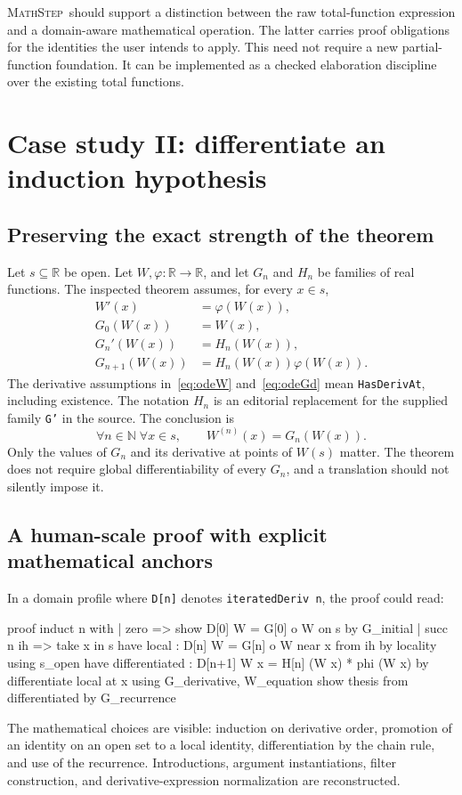 \documentclass[11pt,a4paper]{article}
\theoremstyle{remark}
\newcommand{\ms}{\textsc{MathStep}}
\newcommand{\ty}[1]{\texttt{#1}}
\newcommand{\R}{\mathbb{R}}
\newcommand{\N}{\mathbb{N}}
\begin{document}
\ms\ should support a distinction between the raw total-function expression and a domain-aware mathematical operation. The latter carries proof obligations for the identities the user intends to apply. This need not require a new partial-function foundation. It can be implemented as a checked elaboration discipline over the existing total functions.

\section{Case study II: differentiate an induction hypothesis}\label{sec:ode}

\subsection{Preserving the exact strength of the theorem}
Let $s\subseteq\R$ be open. Let $W,\varphi:\R\to\R$, and let $G_n$ and $H_n$ be families of real functions. The inspected theorem assumes, for every $x\in s$,
\begin{align}
 W'(x)&=\varphi(W(x)),\label{eq:odeW}\\
 G_0(W(x))&=W(x),\label{eq:odeG0}\\
 G_n'(W(x))&=H_n(W(x)),\label{eq:odeGd}\\
 G_{n+1}(W(x))&=H_n(W(x))\varphi(W(x)).\label{eq:odeGs}
\end{align}
The derivative assumptions in~\eqref{eq:odeW} and~\eqref{eq:odeGd} mean \ty{HasDerivAt}, including existence. The notation $H_n$ is an editorial replacement for the supplied family \ty{G'} in the source. The conclusion is
\begin{equation}\label{eq:odeconclusion}
\forall n\in\N\;\forall x\in s,\qquad W^{(n)}(x)=G_n(W(x)).
\end{equation}
Only the values of $G_n$ and its derivative at points of $W(s)$ matter. The theorem does not require global differentiability of every $G_n$, and a translation should not silently impose it.\cite{proveit-ode}

\subsection{A human-scale proof with explicit mathematical anchors}
In a domain profile where \ty{D[n]} denotes \ty{iteratedDeriv n}, the proof could read:
\Needspace{178pt}
\begin{code}
proof
  induct n with
  | zero =>
      show D[0] W = G[0] o W on s by G_initial
  | succ n ih =>
      take x in s
      have local : D[n] W = G[n] o W near x
        from ih by locality using s_open
      have differentiated :
          D[n+1] W x = H[n] (W x) * phi (W x)
        by differentiate local at x
          using G_derivative, W_equation
      show thesis from differentiated by G_recurrence
\end{code}
The mathematical choices are visible: induction on derivative order, promotion of an identity on an open set to a local identity, differentiation by the chain rule, and use of the recurrence. Introductions, argument instantiations, filter construction, and derivative-expression normalization are reconstructed.
\end{document}
